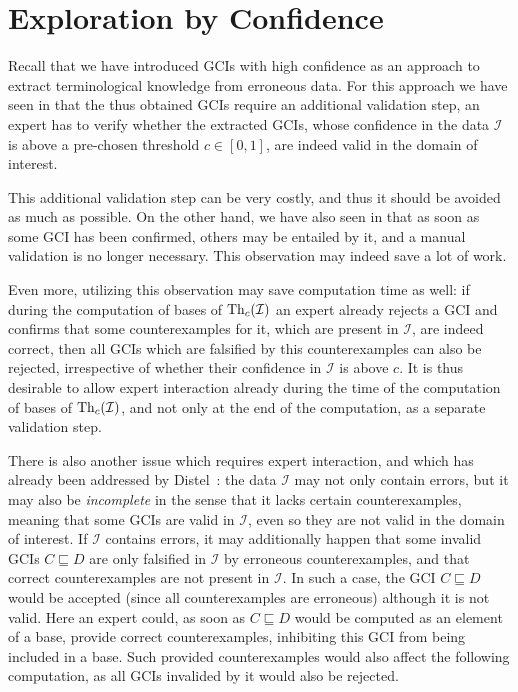 \chapter{Exploration by Confidence}
\label{cha:expl-conf}

Recall that we have introduced GCIs with high confidence as an approach to extract
terminological knowledge from erroneous data.  For this approach we have seen in
 that the thus obtained GCIs require an additional validation
step, \ie an expert has to verify whether the extracted GCIs, whose confidence in the data
$\mathcal{I}$ is above a pre-chosen threshold $c \in [0,1]$, are indeed valid in the
domain of interest.

This additional validation step can be very costly, and thus it should be avoided as much
as possible.  On the other hand, we have also seen in  that as
soon as some GCI has been confirmed, others may be entailed by it, and a manual validation
is no longer necessary.  This observation may indeed save a lot of work.

Even more, utilizing this observation may save computation time as well: if during the
computation of bases of $\operatorname{Th}_c(\mathcal{I})$ an expert already rejects a GCI and confirms
that some counterexamples for it, which are present in $\mathcal{I}$, are indeed correct,
then all GCIs which are falsified by this counterexamples can also be rejected,
irrespective of whether their confidence in $\mathcal{I}$ is above $c$.  It is thus
desirable to allow expert interaction already during the time of the computation of bases
of $\operatorname{Th}_c(\mathcal{I})$, and not only at the end of the computation, as a separate
validation step.

There is also another issue which requires expert interaction, and which has already been
addressed by Distel~\cite{Diss-Felix}: the data $\mathcal{I}$ may not only contain errors,
but it may also be \emph{incomplete} in the sense that it lacks certain counterexamples,
meaning that some GCIs are valid in $\mathcal{I}$, even so they are not valid in the
domain of interest.  If $\mathcal{I}$ contains errors, it may additionally happen that
some invalid GCIs $C \sqsubseteq D$ are only falsified in $\mathcal{I}$ by erroneous
counterexamples, and that correct counterexamples are not present in $\mathcal{I}$.  In
such a case, the GCI $C \sqsubseteq D$ would be accepted (since all counterexamples are
erroneous) although it is not valid.  Here an expert could, as soon as $C \sqsubseteq D$
would be computed as an element of a base, provide correct counterexamples, inhibiting
this GCI from being included in a base.  Such provided counterexamples would also affect
the following computation, as all GCIs invalided by it would also be rejected.

